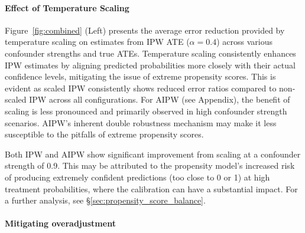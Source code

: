 \documentclass[11pt]{article}
\begin{document}
\paragraph{Effect of Temperature Scaling}





Figure~\ref{fig:combined} (Left) presents the average error reduction provided by temperature scaling on estimates from IPW ATE (\(\alpha=0.4\)) across various confounder strengths and true ATEs. Temperature scaling consistently enhances IPW estimates by aligning predicted probabilities more closely with their actual confidence levels,  mitigating the issue of extreme propensity scores. This is evident as scaled IPW consistently shows reduced error ratios compared to non-scaled IPW across all configurations. For AIPW (see Appendix), the benefit of scaling is less pronounced and primarily observed in high confounder strength scenarios. AIPW's inherent double robustness mechanism may make it less susceptible to the pitfalls of extreme propensity scores. 

Both IPW and AIPW show significant improvement from scaling at a confounder strength of 0.9. This may be attributed to the propensity model's increased risk of producing extremely confident predictions (too close to 0 or 1) at high treatment probabilities, where the calibration can have a substantial impact. For a further analysis, see \S\ref{sec:propensity_score_balance}.


\paragraph{Mitigating overadjustment} %
\end{document}
